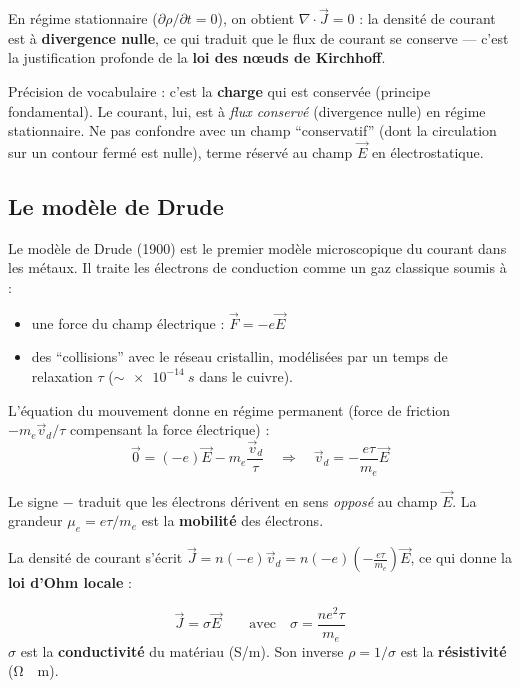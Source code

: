 \documentclass[12pt,a4paper,twoside]{book}
\begin{document}
En régime stationnaire ($\partial \rho / \partial t = 0$), on obtient $\nabla \cdot \vec{J} = 0$ : la densité de courant est à \textbf{divergence nulle}, ce qui traduit que le flux de courant se conserve — c'est la justification profonde de la \textbf{loi des n\oe uds de Kirchhoff}.

\begin{attention}
Précision de vocabulaire : c'est la \textbf{charge} qui est conservée (principe fondamental). Le courant, lui, est à \textit{flux conservé} (divergence nulle) en régime stationnaire. Ne pas confondre avec un champ ``conservatif'' (dont la circulation sur un contour fermé est nulle), terme réservé au champ $\vec{E}$ en électrostatique.
\end{attention}

\subsection{Le modèle de Drude}

Le modèle de Drude (1900) est le premier modèle microscopique du courant dans les métaux. Il traite les électrons de conduction comme un gaz classique soumis à :
\begin{itemize}[nosep]
\item une force du champ électrique : $\vec{F} = -e\vec{E}$
\item des ``collisions'' avec le réseau cristallin, modélisées par un temps de relaxation $\tau$ ($\sim \SI{e-14}{s}$ dans le cuivre).
\end{itemize}

L'équation du mouvement donne en régime permanent (force de friction $-m_e\vec{v}_d/\tau$ compensant la force électrique) :
\[
\vec{0} = (-e)\vec{E} - m_e\frac{\vec{v}_d}{\tau} \quad \Longrightarrow \quad \vec{v}_d = -\frac{e\tau}{m_e}\vec{E}
\]

Le signe $-$ traduit que les électrons dérivent en sens \textit{opposé} au champ $\vec{E}$. La grandeur $\mu_e = e\tau / m_e$ est la \textbf{mobilité} des électrons.

La densité de courant s'écrit $\vec{J} = n(-e)\vec{v}_d = n(-e)\left(-\frac{e\tau}{m_e}\right)\vec{E}$, ce qui donne la \textbf{loi d'Ohm locale} :

\begin{formule}
\[
\boxed{\vec{J} = \sigma \vec{E}} \qquad \text{avec} \quad \sigma = \frac{n e^2 \tau}{m_e}
\]
$\sigma$ est la \textbf{conductivité} du matériau (\si{S/m}). Son inverse $\rho = 1/\sigma$ est la \textbf{résistivité} (\si{\ohm\cdot m}).
\end{formule}
\end{document}

